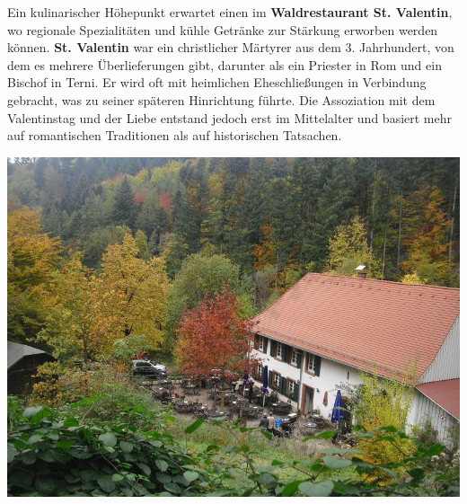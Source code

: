 \documentclass[landscape, a4paper]{article}
\newcommand\alert[1]{\textcolor{PrimaryColor}{\textbf{#1}}}
\begin{document}
\begin{minipage}[t]{0.32\textwidth}
\end{minipage}
\hspace{0.4cm}
\begin{minipage}[t]{0.32\textwidth}
	\vspace{0cm}
	\setlength{\parskip}{0.25cm}

	Ein kulinarischer Höhepunkt erwartet einen im \alert{Waldrestaurant St. Valentin}, wo regionale Spezialitäten und kühle Getränke zur Stärkung erworben werden können. \alert{St. Valentin} war ein christlicher Märtyrer aus dem 3. Jahrhundert, von dem es mehrere Überlieferungen gibt, darunter als ein Priester in Rom und ein Bischof in Terni. Er wird oft mit heimlichen Eheschließungen in Verbindung gebracht, was zu seiner späteren Hinrichtung führte. Die Assoziation mit dem Valentinstag und der Liebe entstand jedoch erst im Mittelalter und basiert mehr auf romantischen Traditionen als auf historischen Tatsachen.

	\includegraphics[width=\linewidth]{./figures/stvalentin.png}
	\setlength{\parskip}{0.25cm}
	\vspace{0.15cm}


\end{minipage}
\end{document}
